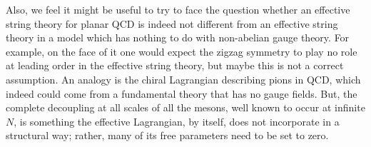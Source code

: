 Also, we feel it might be useful to try to face the question
whether an effective string theory for planar QCD is indeed not
different from an effective string theory in a model which has
nothing to do with non-abelian gauge theory. For example, on the
face of it one would expect the zigzag symmetry to play no role at
leading order in the effective string theory, but maybe this is
not a correct assumption. An analogy is the chiral Lagrangian
describing pions in QCD, which indeed could come from a
fundamental theory that has no gauge fields. But, the complete
decoupling at all scales of all the mesons, well known to occur at
infinite $N$, is something the effective Lagrangian, by itself,
does not incorporate in a structural way; rather, many of its free
parameters need to be set to zero.
